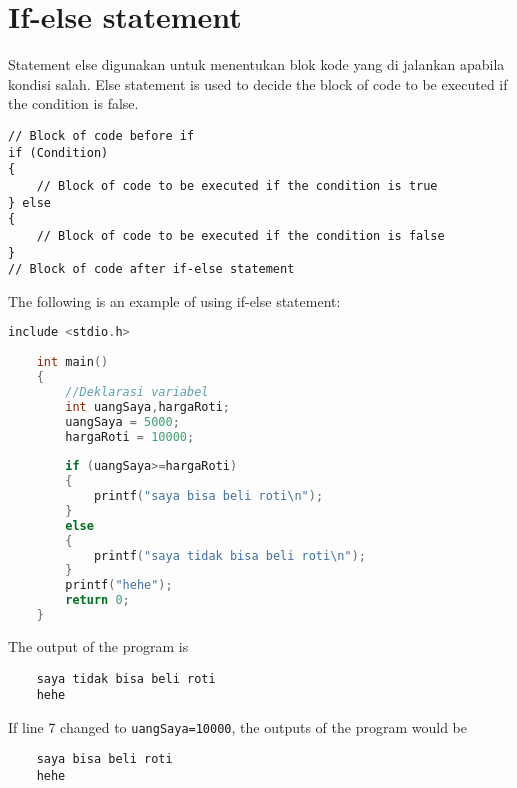 \section{If-else statement}
Statement else digunakan untuk menentukan blok kode yang di jalankan apabila kondisi salah. 
Else statement is used to decide the block of code to be executed if the condition is false.
\begin{verbatim}
// Block of code before if
if (Condition) 
{
	// Block of code to be executed if the condition is true
} else
{
	// Block of code to be executed if the condition is false
}
// Block of code after if-else statement
\end{verbatim}
The following is an example of using if-else statement:
\begin{lstlisting}[language=c,caption = if-else example,label=lst:ifelseexample01]
	include <stdio.h>
	
	int main()
	{
		//Deklarasi variabel 
		int uangSaya,hargaRoti;
		uangSaya = 5000;
		hargaRoti = 10000;
		
		if (uangSaya>=hargaRoti)
		{
		    printf("saya bisa beli roti\n");
		}
		else
		{
	        printf("saya tidak bisa beli roti\n");	
		}
		printf("hehe");
		return 0;
	}
\end{lstlisting}                        
The output of the program is
\begin{verbatim}
    saya tidak bisa beli roti
    hehe
\end{verbatim}
If line 7 changed to \verb|uangSaya=10000|, the outputs of the program would be
\begin{verbatim}
    saya bisa beli roti
    hehe
\end{verbatim}
